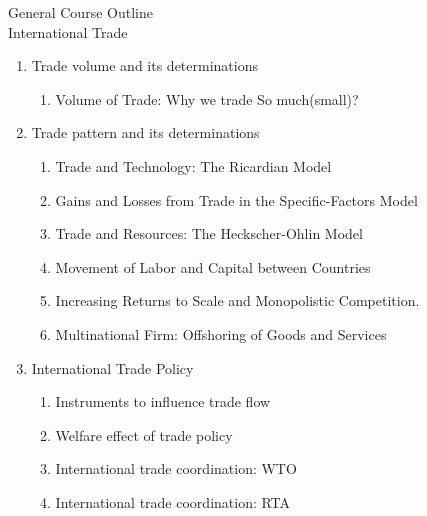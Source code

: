 \documentclass[10pt,hyperref={CJKbookmarks=true},xcolor=dvipsnames,aspectratio=169]{beamer}
\begin{document}
\begin{frame}{General Course Outline\\International Trade}

\begin{enumerate}
\item Trade volume and its determinations
\begin{enumerate}
\item Volume of Trade: Why we trade So much(small)?	 	
\end{enumerate}
\item Trade pattern and its determinations
\begin{enumerate}
\item Trade and Technology: The Ricardian Model 
\item Gains and Losses from Trade in the Specific-Factors Model 
\item Trade and Resources: The Heckscher-Ohlin Model 
\item Movement of Labor and Capital between Countries 
\item Increasing Returns to Scale and Monopolistic Competition. 
\item Multinational Firm: Offshoring of Goods and Services 
\end{enumerate}
\item International Trade Policy
\begin{enumerate}
\item Instruments to influence trade flow
\item Welfare effect of trade policy
\item International trade coordination: WTO
\item International trade coordination: RTA
\end{enumerate}
\end{enumerate}
\end{frame}
\end{document}
